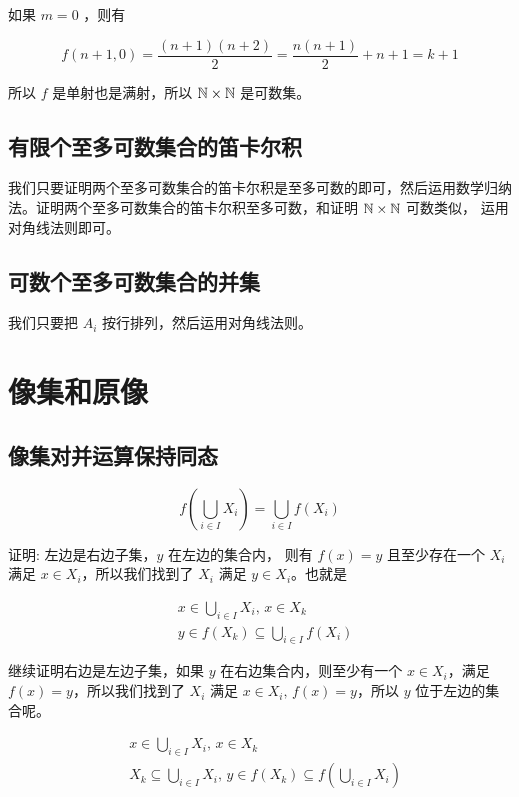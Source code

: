 如果 $m = 0$ ，则有

\[
f(n+1, 0) = \frac{(n+1)(n+2)}{2} = \frac{n(n+1)}{2} + n + 1 = k + 1
\]

所以 $f$ 是单射也是满射，所以 $\mathbb{N} \times \mathbb{N}$ 是可数集。


\subsection{有限个至多可数集合的笛卡尔积}

我们只要证明两个至多可数集合的笛卡尔积是至多可数的即可，然后运用数学归纳法。证明两个至多可数集合的笛卡尔积至多可数，和证明 $\mathbb{N} \times \mathbb{N}$ 可数类似，
运用对角线法则即可。


\subsection{可数个至多可数集合的并集}

我们只要把 $A_i$ 按行排列，然后运用对角线法则。

\section{像集和原像}

\subsection{像集对并运算保持同态}

\[
f(\bigcup_{i \in I} X_i) = \bigcup_{i \in I} f(X_i)
\]


证明: 左边是右边子集，$y$ 在左边的集合内， 则有 $f(x) = y$ 且至少存在一个 $X_i$ 满足 $x \in X_i$，所以我们找到了 $X_i$ 满足 $y \in X_i$。也就是

\begin{align*}
    & x \in \bigcup_{i \in I}X_i,\, x \in X_k \\
    & y \in f(X_k) \subseteq \bigcup_{i \in I}f(X_i)
\end{align*}

继续证明右边是左边子集，如果 $y$ 在右边集合内，则至少有一个 $x \in X_i$，满足 $f(x) = y$，所以我们找到了 $X_i$ 满足 $x \in X_i,\, f(x) = y$，所以 
$y$ 位于左边的集合呢。

\begin{align*}
    & x \in \bigcup_{i \in I}X_i,\, x \in X_k \\
    & X_k \subseteq \bigcup_{i \in I}X_i ,\, y \in f(X_k) \subseteq f(\bigcup_{i \in I}X_i)
\end{align*}

